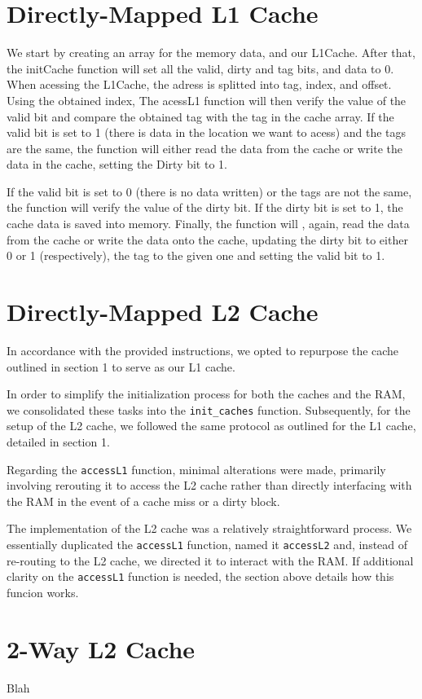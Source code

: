 \documentclass[12pt]{article}
\begin{document}
    \section{Directly-Mapped L1 Cache}\label{L1_cache}

    We start by creating an array for the memory data, and our L1Cache. After that, the initCache function
     will set all the valid, dirty and tag bits, and data to 0. When acessing the L1Cache, the adress is splitted into tag, index, and offset.
     Using the obtained index, The acessL1 function will then verify the value of the valid bit and compare the obtained tag with the tag 
     in the cache array. If the valid bit is set to 1 (there is data in the location we want to acess) and the tags are the same, the function 
     will either read the data from the cache or write the data in the cache, setting the Dirty bit to 1. 

    If the valid bit is set to 0 (there is no data written) or the tags are not the same, the function will verify the
     value of the dirty bit. If the dirty bit is set to 1, the cache data is saved into memory. Finally, the function will , again,
     read the data from the cache or write the data onto the cache, updating the dirty bit to either 0 or 1 (respectively), the tag to the given one
     and setting the valid bit to 1.

    \section{Directly-Mapped L2 Cache}

    In accordance with the provided instructions, we opted to repurpose the cache outlined in section 1 to serve as our L1 cache.

    In order to simplify the initialization process for both the caches and the RAM, we consolidated these tasks into the \texttt{init\_caches} 
     function. Subsequently, for the setup of the L2 cache, we followed the same protocol as outlined for the L1 cache, detailed in section 1.

    Regarding the \texttt{accessL1} function, minimal alterations were made, primarily involving rerouting it to access the L2 cache rather than directly
     interfacing with the RAM in the event of a cache miss or a dirty block.

    The implementation of the L2 cache was a relatively straightforward process. We essentially duplicated the \texttt{accessL1} function, named it \texttt{accessL2} and,
     instead of re-routing to the L2 cache, we directed it to interact with the RAM. If additional clarity on the \texttt{accessL1} function is needed, the section above 
     details how this funcion works.


    \section{2-Way L2 Cache}

    Blah
\end{document}
